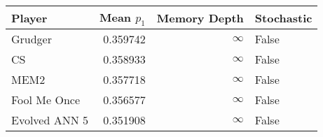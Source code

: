 \begin{tabular}{lrrl}
\toprule
        Player &  Mean $p_1$ &  Memory Depth & Stochastic \\
\midrule
       Grudger &    0.359742 &            \(\infty\) &      False \\
            CS &    0.358933 &            \(\infty\) &      False \\
          MEM2 &    0.357718 &            \(\infty\) &      False \\
  Fool Me Once &    0.356577 &            \(\infty\) &      False \\
 Evolved ANN 5 &    0.351908 &            \(\infty\) &      False \\
\bottomrule
\end{tabular}
